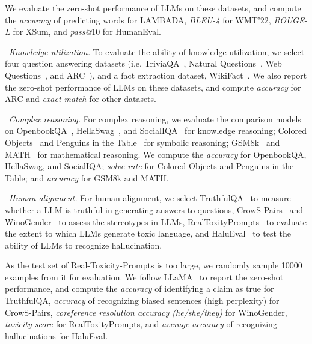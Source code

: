 {{We evaluate the zero-shot performance of LLMs on these datasets, and compute the \emph{accuracy} of predicting words for LAMBADA, \emph{BLEU-4} for WMT'22, \emph{ROUGE-L} for XSum, and \emph{pass@$10$} for HumanEval.

\textbullet~\emph{Knowledge utilization.} To evaluate the ability of knowledge utilization, we select four question answering datasets (i.e. TriviaQA~\cite{Joshi-ACL-2017-TriviaQA}, Natural Questions~\cite{Kwiatkowski-ACL-2019-Natural}, Web Questions~\cite{Berant-EMNLP-2013-Semantic}, and ARC~\cite{Clark-arxiv-2018-Think}), and a fact extraction dataset, WikiFact~\cite{Goodrich-KDD-2019-Assessing}. We also report the zero-shot performance of LLMs on these datasets, {and compute \emph{accuracy} for ARC and \emph{exact match} for other datasets.} 

\textbullet~\emph{Complex reasoning.} For complex reasoning, we evaluate the comparison models on OpenbookQA~\cite{Mihaylov-EMNLP-2018-Can}, HellaSwag~\cite{Zellers-acl-2019-HellaSwag}, and SocialIQA~\cite{Sap-arxiv-2019-SocialIQA} for knowledge reasoning; Colored Objects~\cite{Srivastava-arxiv-2022-Beyond} and Penguins in the Table~\cite{Srivastava-arxiv-2022-Beyond} for symbolic reasoning; GSM8k~\cite{Cobbe-arxiv-2021-Training} and MATH~\cite{Hendrycks-ICLR-2021-Measuring} for mathematical reasoning. We compute the \emph{accuracy} for OpenbookQA, HellaSwag, and SocialIQA; \emph{solve rate} for Colored Objects and Penguins in the Table; and \emph{accuracy} for GSM8k and MATH. 

\textbullet~\emph{Human alignment.} For human alignment, we select TruthfulQA~\cite{Lin-ACL-2022-TruthfulQA} to measure whether a LLM is truthful in generating answers to questions, CrowS-Pairs~\cite{Nangia-EMNLP-2020-CrowS} and WinoGender~\cite{Rudinger-NAACL-2018-Gender} to assess the stereotypes in LLMs, RealToxityPrompts~\cite{Gehman-2023-arxiv-RealToxicityPrompts} to evaluate the extent to which LLMs generate toxic language, and HaluEval~\cite{Li-arxiv-2023-HaluEval} to test the ability of LLMs to recognize hallucination.

As the test set of Real-Toxicity-Prompts is too large, we randomly sample 10000 examples from it for evaluation. We follow LLaMA~\cite{Touvron-arxiv-2023-LLaMA} to report the zero-shot performance, and compute the \emph{accuracy} of identifying a claim as true for TruthfulQA, \emph{accuracy} of recognizing biased sentences (high perplexity) for CrowS-Pairs, \emph{coreference resolution accuracy (he/she/they)} for WinoGender, \emph{toxicity score} for RealToxityPrompts, and \emph{average accuracy} of recognizing hallucinations for HaluEval. 

}}
